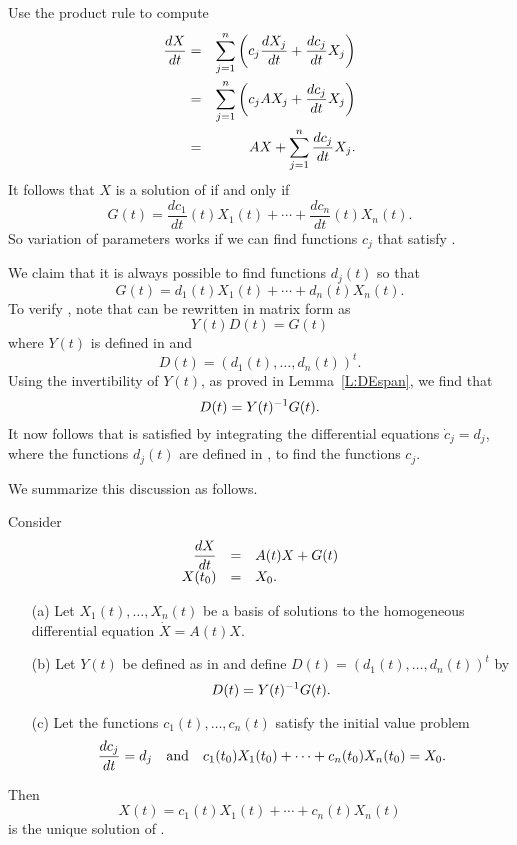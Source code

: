 \documentclass{ximera}
\begin{document}
Use the product rule to compute
\begin{eqnarray*}
\displaystyle\frac{dX}{dt} & = &\sum_{j=1}^n\left(c_j\frac{dX_j}{dt}
+\frac{dc_j}{dt} X_j\right)\\
& = & \sum_{j=1}^n\left( c_jAX_j+\frac{dc_j}{dt}X_j\right)\\
& = & AX+\sum_{j=1}^n \frac{dc_j}{dt}X_j.
\end{eqnarray*}
It follows that $X$ is a solution of  if and only if
\begin{equation}  \label{eq:dcjXj}
G(t) = \frac{dc_1}{dt}(t) X_1(t) + \cdots + \frac{dc_n}{dt}(t) X_n(t).
\end{equation}
So variation of parameters works if we can find functions $c_j$ that 
satisfy .

We claim that it is always possible to find functions $d_j(t)$ so that 
\begin{equation}  \label{E:djXj}
G(t) = d_1(t)X_1(t) + \cdots + d_n(t)X_n(t).
\end{equation} 
To verify , note that   can be rewritten in matrix 
form as
\[
Y(t) D(t) = G(t)
\]
where $Y(t)$ is defined in  and
\[
D(t)=(d_1(t),\ldots,d_n(t))^t.
\]
Using the invertibility of 
$Y(t)$, as proved in Lemma~\ref{L:DEspan}, we find that
\[
D(t) = Y(t)^{-1} G(t).
\] 
It now follows that  is satisfied by integrating the 
differential equations $\dot{c}_j=d_j$, where the functions $d_j(t)$ 
are defined in , to find the functions $c_j$.  

We summarize this discussion as follows. 
\begin{thm} \label{thm:varparsys}
Consider 
\begin{equation}  \label{eq:VPS}
\begin{array}{rcl}
\displaystyle \frac{dX}{dt} & = & A(t)X+G(t)\\
X(t_0) & = & X_0.
\end{array}
\end{equation}
\begin{itemize}
\item[(a)]  Let $X_1(t),\ldots,X_n(t)$ be a 
basis of solutions to 
the homogeneous differential equation $\dot{X}=A(t)X$.  
\item[(b)]  Let $Y(t)$ be defined as in  and define 
$D(t)=(d_1(t),\ldots,d_n(t))^t$ by 
\begin{equation}  \label{e:D(t)}
D(t) = Y(t)^{-1} G(t).
\end{equation}
\item[(c)]  Let the functions $c_1(t),\ldots,c_n(t)$ satisfy the initial 
value problem 
\begin{equation}  \label{eq:cj0}
\frac{dc_j}{dt}=d_j \quad\mbox{and}\quad  c_1(t_0)X_1(t_0) + \cdots +c_n(t_0)X_n(t_0) = X_0.
\end{equation}
\end{itemize}
Then
\[
X(t) =  c_1(t)X_1(t) + \cdots + c_n(t)X_n(t)
\]
is the unique solution of .
\end{thm}
\end{document}
